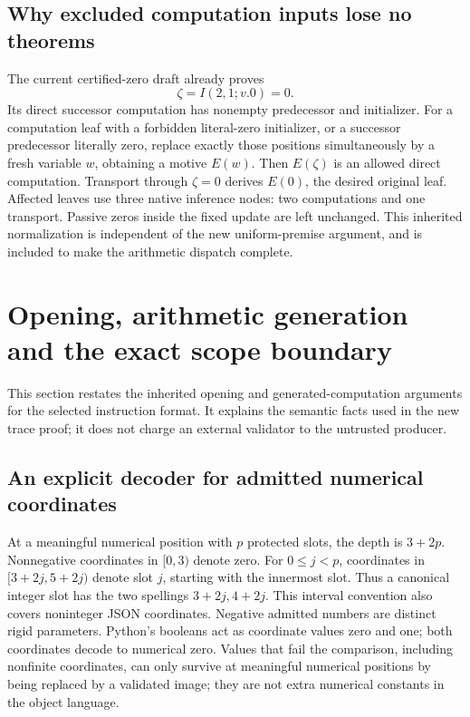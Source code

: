 \documentclass[11pt,letterpaper]{article}
\theoremstyle{definition}\newtheorem{definition}[theorem]{Definition}
\theoremstyle{remark}\newtheorem{remark}[theorem]{Remark}
\begin{document}
\subsection{Why excluded computation inputs lose no theorems}

The current certified-zero draft already proves
\[
                         \zeta=I(2,1;v.0)=0.
\]
Its direct successor computation has nonempty predecessor and initializer.
For a computation leaf with a forbidden literal-zero initializer, or a
successor predecessor literally zero, replace exactly those positions
simultaneously by a fresh variable \(w\), obtaining a motive \(E(w)\).
Then \(E(\zeta)\) is an allowed direct computation. Transport through
\(\zeta=0\) derives \(E(0)\), the desired original leaf. Affected
leaves use three native inference nodes: two computations and one
transport. Passive zeros inside the fixed update are left unchanged.
This inherited normalization is independent of the new uniform-premise
argument, and is included to make the arithmetic dispatch complete.


\section{Opening, arithmetic generation and the exact scope boundary}
\label{sec:opening-details}

This section restates the inherited opening and generated-computation
arguments \cite{arity,certified} for the selected instruction format.
It explains the semantic facts used in the new trace proof; it does not
charge an external validator to the untrusted producer.

\subsection{An explicit decoder for admitted numerical coordinates}

At a meaningful numerical position with \(p\) protected slots, the
depth is \(3+2p\). Nonnegative coordinates in \([0,3)\) denote zero.
For \(0\le j<p\), coordinates in \([3+2j,5+2j)\) denote slot \(j\),
starting with the innermost slot. Thus a canonical integer slot has
the two spellings \(3+2j,4+2j\). This interval convention also covers
noninteger JSON coordinates. Negative admitted numbers are distinct
rigid parameters. Python's booleans act as coordinate values zero and
one; both coordinates decode to numerical zero. Values that fail the comparison,
including nonfinite coordinates, can only survive at meaningful
numerical positions by being replaced by a validated image; they are
not extra numerical constants in the object language.
\end{document}
